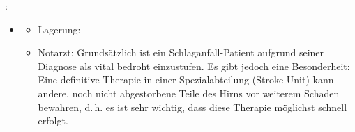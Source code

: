 {: 

\begin{itemize}
  \item \TxMassVitMKBes
  \begin{itemize}
    \item Lagerung: 
    \item Notarzt: Grundsätzlich ist ein
    Schlaganfall-Patient aufgrund seiner Diagnose als vital
    bedroht einzustufen. Es gibt jedoch eine Besonderheit:
    Eine definitive Therapie in einer Spezialabteilung
    (Stroke Unit) kann andere, noch nicht abgestorbene Teile
    des Hirns vor weiterem Schaden bewahren, d.\,h. es ist
    sehr wichtig, dass diese Therapie möglichst schnell
    erfolgt.
    

\end{itemize}
\end{itemize}}
